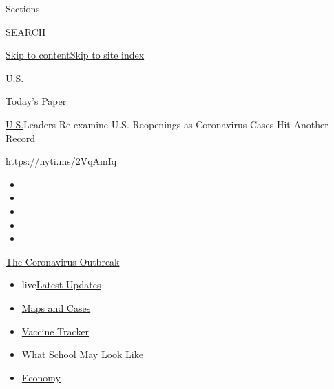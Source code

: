 Sections

SEARCH

\protect\hyperlink{site-content}{Skip to
content}\protect\hyperlink{site-index}{Skip to site index}

\href{https://www.nytimes.com/section/us}{U.S.}

\href{https://myaccount.nytimes.com/auth/login?response_type=cookie\&client_id=vi}{}

\href{https://www.nytimes.com/section/todayspaper}{Today's Paper}

\href{/section/us}{U.S.}\textbar{}Leaders Re-examine U.S. Reopenings as
Coronavirus Cases Hit Another Record

\url{https://nyti.ms/2VqAmIq}

\begin{itemize}
\item
\item
\item
\item
\item
\end{itemize}

\href{https://www.nytimes.com/news-event/coronavirus?action=click\&pgtype=Article\&state=default\&region=TOP_BANNER\&context=storylines_menu}{The
Coronavirus Outbreak}

\begin{itemize}
\tightlist
\item
  live\href{https://www.nytimes.com/2020/08/02/world/coronavirus-updates.html?action=click\&pgtype=Article\&state=default\&region=TOP_BANNER\&context=storylines_menu}{Latest
  Updates}
\item
  \href{https://www.nytimes.com/interactive/2020/us/coronavirus-us-cases.html?action=click\&pgtype=Article\&state=default\&region=TOP_BANNER\&context=storylines_menu}{Maps
  and Cases}
\item
  \href{https://www.nytimes.com/interactive/2020/science/coronavirus-vaccine-tracker.html?action=click\&pgtype=Article\&state=default\&region=TOP_BANNER\&context=storylines_menu}{Vaccine
  Tracker}
\item
  \href{https://www.nytimes.com/interactive/2020/07/29/us/schools-reopening-coronavirus.html?action=click\&pgtype=Article\&state=default\&region=TOP_BANNER\&context=storylines_menu}{What
  School May Look Like}
\item
  \href{https://www.nytimes.com/live/2020/07/31/business/stock-market-today-coronavirus?action=click\&pgtype=Article\&state=default\&region=TOP_BANNER\&context=storylines_menu}{Economy}
\end{itemize}

